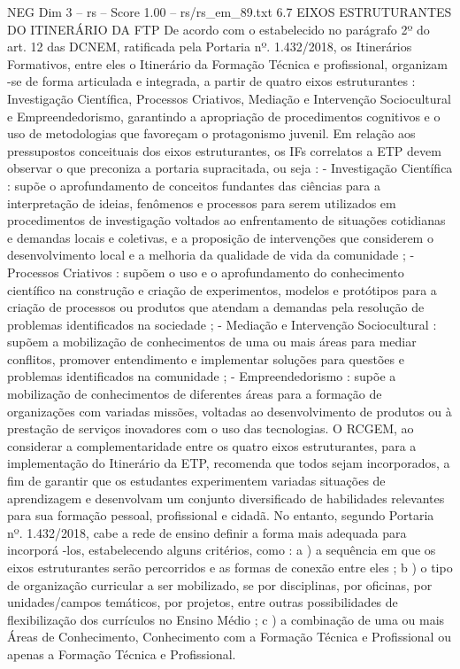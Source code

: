 \begin{textsample}{NEG Dim 3 – rs – Score 1.00 – rs/rs\_em\_89.txt}  \label{ex:f3_neg_046}
6.7 EIXOS ESTRUTURANTES DO ITINERÁRIO DA FTP De acordo com o estabelecido no parágrafo 2º do art. 12 das DCNEM, ratificada pela Portaria nº. 1.432/2018, os Itinerários Formativos, entre eles o Itinerário da Formação Técnica e profissional, organizam -se de forma articulada e integrada, a partir de quatro eixos estruturantes : Investigação Científica, Processos Criativos, Mediação e Intervenção Sociocultural e Empreendedorismo, garantindo a apropriação de procedimentos cognitivos e o uso de metodologias que favoreçam o protagonismo juvenil.
Em relação aos pressupostos conceituais dos eixos estruturantes, os IFs correlatos a ETP devem observar o que preconiza a portaria supracitada, ou seja : - Investigação Científica : supõe o aprofundamento de conceitos fundantes das ciências para a interpretação de ideias, fenômenos e processos para serem utilizados em procedimentos de investigação voltados ao enfrentamento de situações cotidianas e demandas locais e coletivas, e a proposição de intervenções que considerem o desenvolvimento local e a melhoria da qualidade de vida da comunidade ; - Processos Criativos : supõem o uso e o aprofundamento do conhecimento científico na construção e criação de experimentos, modelos e protótipos para a criação de processos ou produtos que atendam a demandas pela resolução de problemas identificados na sociedade ; - Mediação e Intervenção Sociocultural : supõem a mobilização de conhecimentos de uma ou mais áreas para mediar conflitos, promover entendimento e implementar soluções para questões e problemas identificados na comunidade ; - Empreendedorismo : supõe a mobilização de conhecimentos de diferentes áreas para a formação de organizações com variadas missões, voltadas ao desenvolvimento de produtos ou à prestação de serviços inovadores com o uso das tecnologias.
O RCGEM, ao considerar a complementaridade entre os quatro eixos estruturantes, para a implementação do Itinerário da ETP, recomenda que todos sejam incorporados, a fim de garantir que os estudantes experimentem variadas situações de aprendizagem e desenvolvam um conjunto diversificado de habilidades relevantes para sua formação pessoal, profissional e cidadã.
No entanto, segundo Portaria nº. 1.432/2018, cabe a rede de ensino definir a forma mais adequada para incorporá -los, estabelecendo alguns critérios, como : a ) a sequência em que os eixos estruturantes serão percorridos e as formas de conexão entre eles ; b ) o tipo de organização curricular a ser mobilizado, se por disciplinas, por oficinas, por unidades/campos temáticos, por projetos, entre outras possibilidades de flexibilização dos currículos no Ensino Médio ; c ) a combinação de uma ou mais Áreas de Conhecimento, Conhecimento com a Formação Técnica e Profissional ou apenas a Formação Técnica e Profissional.

\end{textsample}
